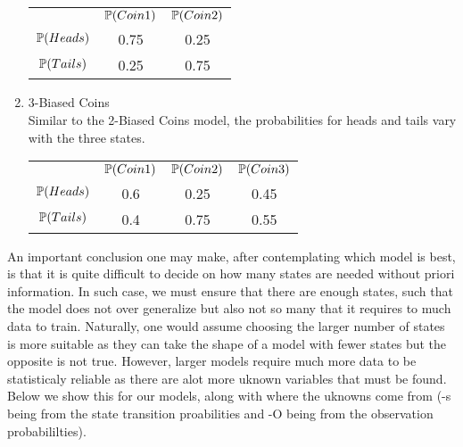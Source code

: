 \begin{example}
\begin{enumerate}
\begin{center}
	
			\begin{tabular}{c c c}
				& $\mathbb{P} (Coin 1)$ & $\mathbb{P} (Coin 2)$ \\
		 		$\mathbb{P} (Heads)$  & 0.75   & 0.25 \\
		 		$\mathbb{P} (Tails)$  & 0.25   & 0.75 \\
			\end{tabular}
		\end{center}
		\item 3-Biased Coins \\ Similar to the 2-Biased Coins model, the probabilities for heads and tails vary with the three states.
		\begin{center}
			\begin{tabular}{c c c c}
				& $\mathbb{P} (Coin 1)$ & $\mathbb{P} (Coin 2)$ & $\mathbb{P} (Coin 3)$\\
		 		$\mathbb{P} (Heads)$  & 0.6   & 0.25 & 0.45 \\
		 		$\mathbb{P} (Tails)$  & 0.4   & 0.75 & 0.55 \\
			\end{tabular}
			\end{center}
	\end{enumerate}
\end{example}

An important conclusion one may make, after contemplating which model is best, is that it is quite difficult to decide on how many states are needed without priori information. In such case, we must ensure that there are enough states, such that the model does not over generalize but also not so many that it requires to much data to train. Naturally, one would assume choosing the larger number of states is more suitable as they can take the shape of a model with fewer states but the opposite is not true. However, larger models require much more data to be statisticaly reliable as there are alot more uknown variables that must be found. Below we show this for our models, along with where the uknowns come from (-s being from the state transition proabilities and -O being from the observation probabililties). 


